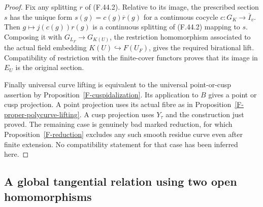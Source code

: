 \begin{proof}
Fix any splitting $r$ of (F.44.2). Relative to its
image, the prescribed section $s$ has the unique form
$s(g)=c(g)\overline r(g)$ for a continuous cocycle
$c:G_K\to\overline I_v$. Then
$g\mapsto j(c(g))r(g)$ is a continuous splitting of
(F.44.2) mapping to $s$. Composing it with
$G_{L_F}\to G_{K(U)}$, the restriction homomorphism
associated to the actual field embedding
$K(U)\hookrightarrow F(U_F)$, gives the required
birational lift. Compatibility of restriction with
the finite-cover functors proves that its image in
$E_U$ is the original section.

Finally universal curve lifting is equivalent to the
universal point-or-cusp assertion by
Proposition~\ref{F-cuspidalization}. Its application to
$B$ gives a point or cusp projection. A point projection
uses its actual fibre as in
Proposition~\ref{F-proper-polycurve-lifting}. A cusp
projection uses $Y_\tau$ and the construction just
proved. The remaining case is genuinely bad marked
reduction, for which Proposition~\ref{F-reduction}
excludes any such smooth residue curve even after
finite extension. No compatibility statement for that
case has been inferred here.
\end{proof}

\subsection{A global tangential relation using two open homomorphisms}

